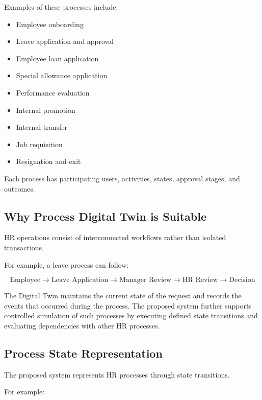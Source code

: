 \documentclass[12pt,a4paper]{article}
\begin{document}
Examples of these processes include:

\begin{itemize}
    \item Employee onboarding
    \item Leave application and approval
    \item Employee loan application
    \item Special allowance application
    \item Performance evaluation
    \item Internal promotion
    \item Internal transfer
    \item Job requisition
    \item Resignation and exit
\end{itemize}

Each process has participating users, activities, states, approval
stages, and outcomes.

\subsection{Why Process Digital Twin is Suitable}

HR operations consist of interconnected workflows rather than
isolated transactions.

For example, a leave process can follow:

\[
\text{Employee}
\rightarrow
\text{Leave Application}
\rightarrow
\text{Manager Review}
\rightarrow
\text{HR Review}
\rightarrow
\text{Decision}
\]

The Digital Twin maintains the current state of the request and
records the events that occurred during the process. The proposed
system further supports controlled simulation of such processes by
executing defined state transitions and evaluating dependencies with
other HR processes.

\subsection{Process State Representation}

The proposed system represents HR processes through state
transitions.

For example:

\begin{center}
\end{center}
\end{document}
